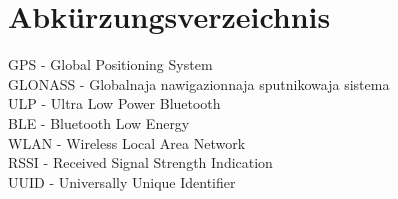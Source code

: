 \chapter*{Abkürzungsverzeichnis}

GPS - Global Positioning System\\
GLONASS - Globalnaja nawigazionnaja sputnikowaja sistema\\
ULP - Ultra Low Power Bluetooth\\
BLE - Bluetooth Low Energy\\
WLAN - Wireless Local Area Network\\
RSSI - Received Signal Strength Indication\\
UUID - Universally Unique Identifier\\

